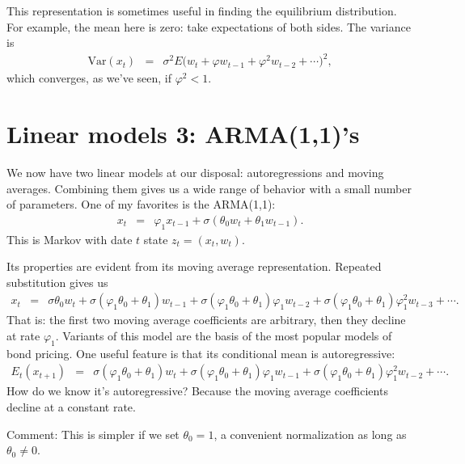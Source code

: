 \documentclass[11pt]{article}
\begin{document}
This representation is sometimes useful in finding the equilibrium distribution.
For example, the mean here is zero:  take expectations of both sides.
The variance is
\begin{eqnarray*}
    \mbox{Var} (x_{t})
            &=& \sigma^2 E  \big( w_t + \varphi w_{t-1} + \varphi^2 w_{t-2}
                + \cdots \big)^2 , %
\end{eqnarray*}
which converges, as we've seen, if $\varphi^2 < 1$.


\section{Linear models 3:  ARMA(1,1)'s}


We now have two linear models at our disposal:  autoregressions and moving averages.
Combining them gives us a wide range of behavior with a small number
of parameters.
One of my favorites is the ARMA(1,1):
\begin{eqnarray*}
    x_t &=& \varphi_1 x_{t-1} + \sigma \left( \theta_0 w_t + \theta_1 w_{t-1} \right) .
\end{eqnarray*}
This is Markov with date $t$ state $z_{t} = (x_t,w_t)$.


Its properties are evident from its moving average representation.
Repeated substitution gives us
\begin{eqnarray*}
    x_t &=&  \sigma \theta_0 w_t + \sigma (\varphi_1\theta_0+ \theta_1) w_{t-1}
                + \sigma (\varphi_1\theta_0+ \theta_1)\varphi_1 w_{t-2}
                + \sigma (\varphi_1\theta_0+ \theta_1)\varphi_1^2 w_{t-3} + \cdots .
\end{eqnarray*}
That is:  the first two moving average coefficients are arbitrary,
then they decline at rate $\varphi_1$.
Variants of this model are the basis of the most popular models of bond pricing.
One useful feature is that its conditional mean is autoregressive:
\begin{eqnarray*}
  E_t ( x_{t+1} ) &=&  \sigma (\varphi_1\theta_0+ \theta_1) w_{t}
                + \sigma (\varphi_1\theta_0+ \theta_1)\varphi_1 w_{t-1}
                + \sigma (\varphi_1\theta_0+ \theta_1)\varphi_1^2 w_{t-2} + \cdots .
\end{eqnarray*}
How do we know it's autoregressive?
Because the moving average coefficients decline at a constant rate.

Comment:  This is simpler if we set $\theta_0 = 1$, a convenient normalization
as long as $\theta_0 \neq 0$.  
\end{document}
